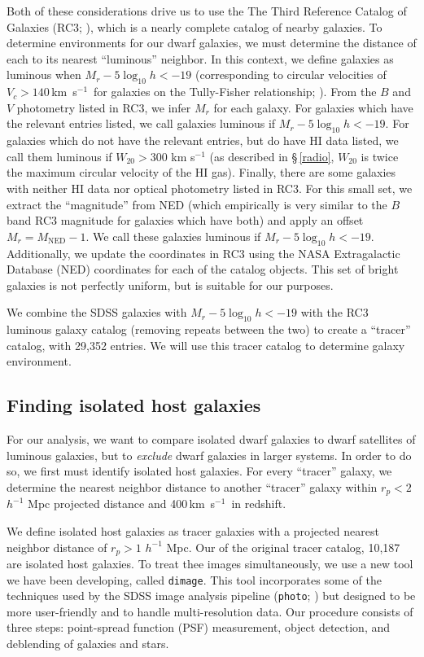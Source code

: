 \documentclass[10pt,preprint]{aastex}
\newcommand{\kms}{\,km~s$^{-1}$}
\begin{document}
Both of these considerations drive us to use the The Third Reference
Catalog of Galaxies (RC3; \citealt{devaucouleurs91a}), which is a
nearly complete catalog of nearby galaxies. To determine environments
for our dwarf galaxies, we must determine the distance of each to its
nearest ``luminous'' neighbor. In this context, we define galaxies as
luminous when $M_r - 5\log_{10} h < -19$ (corresponding to circular
velocities of $V_c > 140$\kms\ for galaxies on the Tully-Fisher
relationship; \citealt{blanton07b}).  From the $B$ and $V$ photometry
listed in RC3, we infer $M_r$ for each galaxy.  For galaxies which
have the relevant entries listed, we call galaxies luminous if $M_r -5
\log_{10} h< -19$. For galaxies which do not have the relevant
entries, but do have HI data listed, we call them luminous if $W_{20}
> 300$ km s$^{-1}$ (as described in
\S\,\ref{radio}, $W_{20}$ is twice the maximum circular velocity of
the HI gas).  Finally, there are some galaxies with neither HI data
nor optical photometry listed in RC3. For this small set, we extract
the ``magnitude'' from NED (which empirically is very similar to the
$B$ band RC3 magnitude for galaxies which have both) and apply an
offset $M_r = M_{\mathrm{NED}} - 1$.  We call these galaxies luminous
if $M_r - 5\log_{10}h<-19$.  Additionally, we update the coordinates
in RC3 using the NASA Extragalactic Database (NED) coordinates for
each of the catalog objects.  This set of bright galaxies is not
perfectly uniform, but is suitable for our purposes.

We combine the SDSS galaxies with $M_r - 5\log_{10} h< -19$ with the
RC3 luminous galaxy catalog (removing repeats between the two) to
create a ``tracer'' catalog, with 29,352 entries. We will use this
tracer catalog to determine galaxy environment.

\subsection{ Finding isolated host galaxies}

For our analysis, we want to compare isolated dwarf galaxies to dwarf
satellites of luminous galaxies, but to {\it exclude} dwarf galaxies
in larger systems. In order to do so, we first must identify isolated
host galaxies. For every ``tracer'' galaxy, we determine the nearest
neighbor distance to another ``tracer'' galaxy within $r_p< 2$
$h^{-1}$ Mpc projected distance and 400\kms\ in redshift.

We define isolated host galaxies as tracer galaxies with a projected
nearest neighbor distance of $r_p>1$ $h^{-1}$ Mpc. Our of the original
tracer catalog, 10,187 are isolated host galaxies.
To treat thee images simultaneously, we use a new tool we have been
developing, called {\tt dimage}. This tool incorporates some of the
techniques used by the SDSS image analysis pipeline ({\tt photo};
\citealt{lupton04a}) but designed to be more user-friendly and to
handle multi-resolution data. Our procedure consists of three steps:
point-spread function (PSF) measurement, object detection, and
deblending of galaxies and stars.
\end{document}
